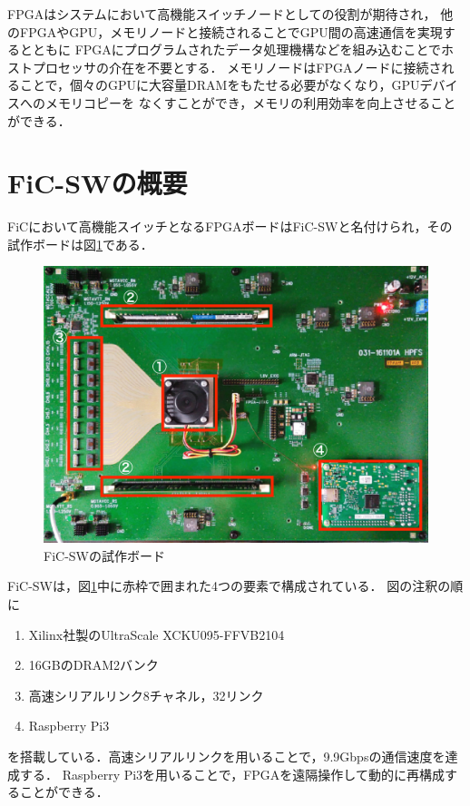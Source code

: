 {  FPGAはシステムにおいて高機能スイッチノードとしての役割が期待され，
  他のFPGAやGPU，メモリノードと接続されることでGPU間の高速通信を実現するとともに
  FPGAにプログラムされたデータ処理機構などを組み込むことでホストプロセッサの介在を不要とする．
  メモリノードはFPGAノードに接続されることで，個々のGPUに大容量DRAMをもたせる必要がなくなり，GPUデバイスへのメモリコピーを
  なくすことができ，メモリの利用効率を向上させることができる．
  
  \section{FiC-SWの概要}
  \label{sec:about_ficsw}
  FiCにおいて高機能スイッチとなるFPGAボードはFiC-SWと名付けられ，その試作ボードは図\ref{fig:ficsw}である．
  
  \begin{figure}[h]
    \centering
    \includegraphics[width=12cm]{./chap3/fig/ficsw.png}
    \caption{FiC-SWの試作ボード}
    \label{fig:ficsw}
  \end{figure}
  
  FiC-SWは，図\ref{fig:ficsw}中に赤枠で囲まれた4つの要素で構成されている．
  図の注釈の順に
  \begin{enumerate}
    \item Xilinx社製のUltraScale XCKU095-FFVB2104
    \item 16GBのDRAM2バンク
    \item 高速シリアルリンク8チャネル，32リンク
    \item Raspberry Pi3
  \end{enumerate}
  を搭載している．高速シリアルリンクを用いることで，9.9Gbpsの通信速度を達成する．
  Raspberry Pi3を用いることで，FPGAを遠隔操作して動的に再構成することができる．
  
}
